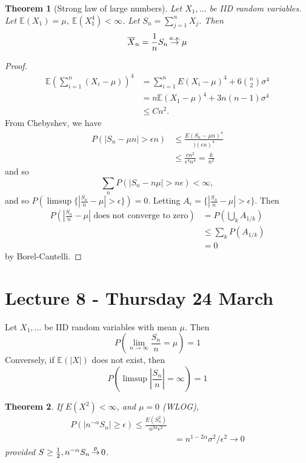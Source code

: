\documentclass[10pt, oneside, reqno]{amsart}
\theoremstyle{plain}%
\newtheorem{thm}{Theorem}[section]
\theoremstyle{definition}
\theoremstyle{remark}
\newcommand{\E}{\mathbb{E}}
\def\cip{\,{\buildrel p \over \rightarrow}\,}
\def\cas{\,{\buildrel a.s. \over \rightarrow}\,}
\begin{document}
\begin{thm}[Strong law of large numbers]  Let $X_1, \dots$ be IID random variables.  Let $\E(X_1) = \mu$, $\E(X_1^4) < \infty$.  Let $S_n = \sum_{j=1}^n X_j$.  Then \[
	\overline X_n = \frac{1}{n} S_n \cas \mu 
\]
\end{thm}

\begin{proof}
	\begin{align*}
		\E(\sum_{i=1}^n (X_i - \mu))^4 &= \sum_{i=1}^n E(X_i - \mu)^4 + 6 {n \choose 2} \sigma^4 \\
		&= n \E(X_1 - \mu)^4 + 3n(n-1) \sigma^4 \\
		&\leq Cn^2. 
	\end{align*}
	From Chebyshev, we have 
	\begin{align*}
		P(| S_n - \mu n| > \epsilon n) &\leq \frac{E(S_n - \mu n)^4}{)(\epsilon n)^4} \\
		 		&\leq \frac{cn^2}{\epsilon^4 n^4} = \frac{k}{n^2} 
	\end{align*}
	and so \[
		\sum_n P(|S_n - n \mu| > n \epsilon) < \infty,	\]
	and so $P(\limsup \{ | \frac{S_n}{n} - \mu | > \epsilon \} ) = 0$.  Letting $A_\epsilon = \{ | \frac{S_n}{n} - \mu | > \epsilon \}$.  Then 
	\begin{align*}
		P(|\frac{S_n}{n} - \mu | \text{ does not converge to zero}) &= P(\bigcup_k A_{1/k}) \\
		&\leq \sum_{k} P(A_{1/k}) \\
		&= 0
	\end{align*} by Borel-Cantelli.
\end{proof}

\section{Lecture 8 - Thursday 24 March} %
\label{sec:lecture_8_thursday_24_march}
	Let $X_1, \dots$ be IID random variables with mean $\mu$.  Then \[
		P(\lim_{n \rightarrow \infty} \frac{S_n}{n} = \mu) = 1
	\]
	Conversely, if $\E(|X|)$ does not exist, then \[
		P( \limsup |\frac{S_n}{n}| = \infty) = 1
	\]

\begin{thm}
	If $E(X^2) < \infty$, and $\mu = 0$ (WLOG), 
	\begin{align*}
		P( |n^{-\alpha} S_n | \geq \epsilon) \leq \frac{E(S_n^2)}{n^{2 \alpha} \epsilon^2} \\
		&=n ^{1-2\alpha} \sigma^2/\epsilon^2 \rightarrow 0
 	\end{align*} provided $S \geq \frac{1}{2}, n^{-\alpha} S_n \cip 0$.  
\end{thm}
\end{document}
